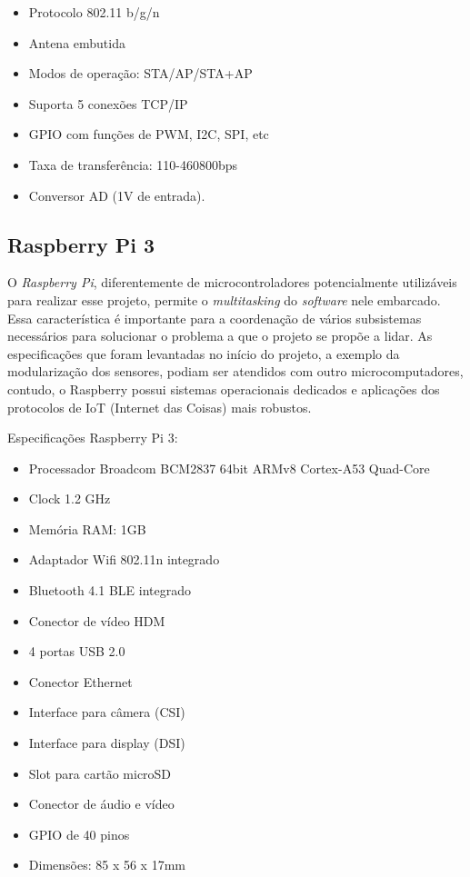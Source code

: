 \begin{itemize}
\item
	Protocolo 802.11 b/g/n
\item
	Antena embutida
\item
	Modos de operação: STA/AP/STA+AP
\item
	Suporta 5 conexões TCP/IP
\item
	GPIO com funções de PWM, I2C, SPI, etc
\item
	Taxa de transferência: 110-460800bps
\item
	Conversor AD (1V de entrada).
\end{itemize}

\subsection{Raspberry Pi 3}

O \textit{Raspberry Pi}, diferentemente de microcontroladores potencialmente utilizáveis para realizar esse projeto, permite o \textit{multitasking} do \textit{software} nele embarcado. Essa característica é importante para a coordenação de vários subsistemas necessários para solucionar o problema a que o projeto se propõe a lidar. As especificações que foram levantadas no início do projeto, a exemplo da modularização dos sensores, podiam ser atendidos com outro microcomputadores, contudo, o Raspberry possui sistemas operacionais dedicados e aplicações dos protocolos de IoT (Internet das Coisas) mais robustos.

Especificações Raspberry Pi 3:
\begin{itemize}
\item Processador Broadcom BCM2837 64bit ARMv8 Cortex-A53 Quad-Core
\item Clock 1.2 GHz
\item Memória RAM: 1GB
\item Adaptador Wifi 802.11n integrado
\item Bluetooth 4.1 BLE integrado
\item Conector de vídeo HDM
\item 4 portas USB 2.0
\item Conector Ethernet
\item Interface para câmera (CSI)
\item Interface para display (DSI)
\item Slot para cartão microSD
\item Conector de áudio e vídeo
\item GPIO de 40 pinos
\item Dimensões: 85 x 56 x 17mm
\end{itemize}

